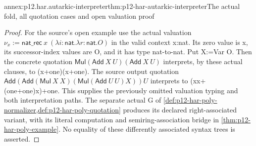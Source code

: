 \begin{annexitem}{annex:p12.har.autarkic-interpreter}{thm:p12-har-autarkic-interpreter}{The actual fold, all quotation cases and open valuation proof}
\begin{proof}
For the source's open example use the actual valuation
\(\nu_x:=\mathsf{nat\_rec}\ x\
(\lambda i:\mathsf{nat}.\lambda r:\mathsf{nat}.O)\)
in the valid context x:nat. Its zero value is x, its successor-index
values are O, and it has type nat-to-nat. Put X:=Var O.
Then the concrete quotation
\(\mathsf{Mul}(\mathsf{Add}\ X\ U)(\mathsf{Add}\ X\ U)\)
interprets, by these actual clauses, to (x+one)(x+one).
The source output quotation
\(\mathsf{Add}(\mathsf{Add}(\mathsf{Mul}\ X\ X)
(\mathsf{Mul}(\mathsf{Add}\ U\ U)X))U\)
interprets to (xx+(one+one)x)+one. This supplies the previously
omitted valuation typing and both interpretation paths. The separate
actual G of \cref{def:p12-har-poly-normalizer,def:p12-har-poly-quotation}
produces its declared right-associated variant, with its literal
computation and semiring-association bridge in \cref{thm:p12-har-poly-example}.
No equality of these differently associated syntax trees is asserted.
\end{proof}
\end{annexitem}

